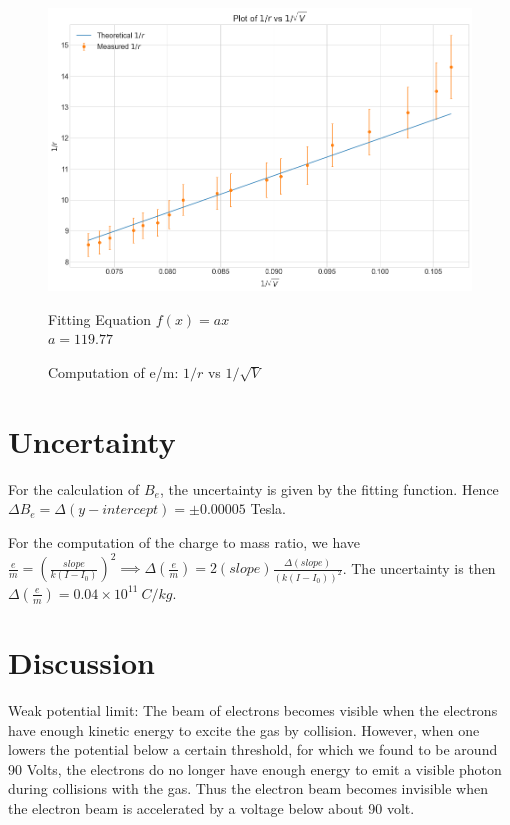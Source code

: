 \documentclass[a4paper,12pt]{article}
\begin{document}
\begin{figure}[H]
  \centering
  \includegraphics[width=0.8\linewidth]{../code/Pankaj/Charge To Mass Ratio.png}   
  \begin{center}
    Fitting Equation $f(x) = ax$ \\
    $a = 119.77$
  \end{center}   
  \caption{Computation of e/m: $1/r$ vs $1/\sqrt{V}$}
  \label{e_m}
\end{figure}

\section{Uncertainty}

For the calculation of $B_e$, the uncertainty is given by the fitting function. Hence $\Delta B_e = \Delta (y-intercept) = \pm 0.00005$ Tesla.

For the computation of the charge to mass ratio, we have $\frac{e}{m} = (\frac{slope}{k(I-I_0)})^2 \implies 
\Delta (\frac{e}{m}) = 2 (slope) \frac{\Delta (slope)}{(k(I-I_0))^2}$. The uncertainty is then $\Delta (\frac{e}{m}) = 0.04 \times 10^{11}\ C/kg$.

\section{Discussion}


Weak potential limit: The beam of electrons becomes visible when the electrons have enough kinetic energy to excite the gas by collision. However, when one lowers the 
potential below a certain threshold, for which we found to be around 90 Volts, the electrons do no longer have enough energy to emit a visible 
photon during collisions with the gas. Thus the electron beam becomes invisible when the electron beam is accelerated by a voltage below about 90 volt.
\end{document}
